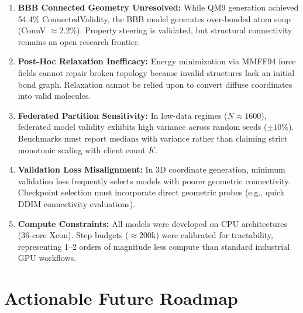 \documentclass[12pt, a4paper]{article}
\begin{document}
\begin{enumerate}[leftmargin=*, label=\textbf{L\arabic*:}]
    \item \textbf{BBB Connected Geometry Unresolved:} While QM9 generation achieved 54.4\% ConnectedValidity, the BBB model generates over-bonded atom soup (ConnV $\approx 2.2\%$). Property steering is validated, but structural connectivity remains an open research frontier.
    \item \textbf{Post-Hoc Relaxation Inefficacy:} Energy minimization via MMFF94 force fields cannot repair broken topology because invalid structures lack an initial bond graph. Relaxation cannot be relied upon to convert diffuse coordinates into valid molecules.
    \item \textbf{Federated Partition Sensitivity:} In low-data regimes ($N \approx 1600$), federated model validity exhibits high variance across random seeds ($\pm 10\%$). Benchmarks must report medians with variance rather than claiming strict monotonic scaling with client count $K$.
    \item \textbf{Validation Loss Misalignment:} In 3D coordinate generation, minimum validation loss frequently selects models with poorer geometric connectivity. Checkpoint selection must incorporate direct geometric probes (e.g., quick DDIM connectivity evaluations).
    \item \textbf{Compute Constraints:} All models were developed on CPU architectures (36-core Xeon). Step budgets ($\approx 200\text{k}$) were calibrated for tractability, representing 1--2 orders of magnitude less compute than standard industrial GPU workflows.
\end{enumerate}

\section{Actionable Future Roadmap}
\end{document}
